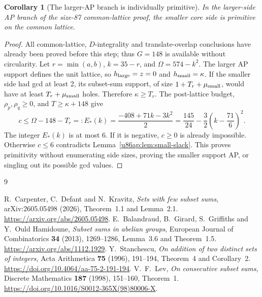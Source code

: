 \documentclass[11pt,a4paper]{article}
\newtheorem{corollary}[theorem]{Corollary}
\theoremstyle{remark}
\begin{document}
\begin{corollary}[The larger-AP branch is individually primitive]
\label{u86ap:cor:primitive}
In the larger-side AP branch of the size-87 common-lattice proof, the
smaller core side is primitive on the common lattice.
\end{corollary}
\begin{proof}
All common-lattice, $D$-integrality and translate-overlap conclusions have
already been proved before this step; thus $G=148$ is available without
circularity. Let $r=\min(a,b)$, $k=35-r$, and
$\Omega=574-k^2$. The larger AP support defines the unit lattice, so
$h_{\rm large}=z=0$ and $h_{\rm small}=\kappa$.
If the smaller side had gcd at least 2, its subset-sum support, of size
$1+T_r+\mu_{\rm small}$, would have at least
$T_r+\mu_{\rm small}$ holes. Therefore $\kappa\ge T_r$.
The post-lattice budget, $\rho_p,\rho_q\ge0$, and
$T\ge\kappa+148$ give
\[
 c\le\Omega-148-T_r=:E_*(k)
 =\frac{-408+71k-3k^2}{2}
 =\frac{145}{24}-\frac32\left(k-\frac{71}{6}\right)^2.
\]
The integer $E_*(k)$ is at most 6. If it is negative, $c\ge0$ is already
impossible. Otherwise $c\le6$ contradicts
Lemma~\ref{u86ap:lem:small-slack}. This proves primitivity without
enumerating side sizes, proving the smaller support AP, or singling out
its possible gcd values.
\end{proof}



\clearpage
\begin{thebibliography}{9}
R.~Carpenter, C.~Defant and N.~Kravitz,
\emph{Sets with few subset sums}, arXiv:2605.05498 (2026),
Theorem~1.1 and Lemma~2.1.
\url{https://arxiv.org/abs/2605.05498}.
E.~Balandraud, B.~Girard, S.~Griffiths and Y.~Ould Hamidoune,
\emph{Subset sums in abelian groups},
European Journal of Combinatorics \textbf{34} (2013), 1269--1286,
Lemma~3.6 and Theorem~1.5.
\url{https://arxiv.org/abs/1112.1929}.
Y.~Stanchescu, \emph{On addition of two distinct sets of integers},
Acta Arithmetica \textbf{75} (1996), 191--194, Theorem~4 and Corollary~2.
\url{https://doi.org/10.4064/aa-75-2-191-194}.
V.~F.~Lev, \emph{On consecutive subset sums},
Discrete Mathematics \textbf{187} (1998), 151--160, Theorem~1.
\url{https://doi.org/10.1016/S0012-365X(98)80006-X}.
\end{thebibliography}
\end{document}
